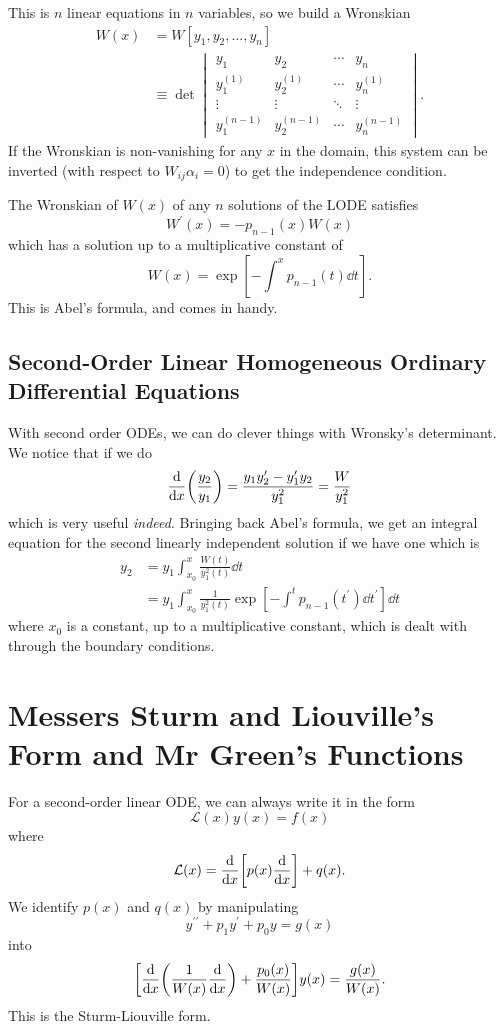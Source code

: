 \documentclass[a4paper,12pt,parskip=full,BCOR=1cm]{scrreprt}
\begin{document}
This is $n$ linear equations in $n$ variables, so we build a Wronskian
\begin{align*}
 W(x) & = W[y_1, y_2, \ldots, y_n] \\
      & \equiv \det
 \begin{vmatrix}
  y_1         & y_2         & \cdots & y_n         \\
  y_1^{(1)}   & y^{(1)}_2   & \cdots & y^{(1)}_n   \\
  \vdots      & \vdots      & \ddots & \vdots      \\
  y_1^{(n-1)} & y^{(n-1)}_2 & \cdots & y^{(n-1)}_n
 \end{vmatrix}.
\end{align*} If the Wronskian is non-vanishing for any $x$ in the domain, this system can be inverted (with respect to $W_{ij}\alpha_i = 0$) to get the independence condition.

The Wronskian of $W(x)$ of any $n$ solutions of the LODE satisfies
$$W^\prime (x) = -p_{n-1}(x)W(x)$$
which has a solution up to a multiplicative constant of
$$W(x) = \exp[-\int^x p_{n-1}(t) \dd{t}].$$ This is Abel's formula, and comes in handy.

\section{Second-Order Linear Homogeneous Ordinary Differential Equations}
With second order ODEs, we can do clever things with Wronsky's determinant.
We notice that if we do
$$\dv{x}(\frac{y_2}{y_1}) = \frac{y_1 y_2^\prime - y_1^\prime y_2}{y_1^2} = \frac{W}{y_1^2}$$ which is very useful \emph{indeed}.
Bringing back Abel's formula, we get an integral equation for the second linearly independent solution if we have one which is
\begin{align*}
 y_2 & = y_1 \int_{x_0}^x \frac{W(t)}{y_1^2(t)} \dd{t}                                            \\
     & =  y_1 \int_{x_0}^x \frac{1}{y_1^2(t)}\exp[-\int^t p_{n-1}(t^\prime) \dd{t^\prime}] \dd{t}
\end{align*}
where $x_0$ is a constant, up to a multiplicative constant, which is dealt with through the boundary conditions.

\chapter{Messers Sturm and Liouville's Form and Mr Green's Functions}
For a second-order linear ODE, we can always write it in the form
$$\mathcal{L}(x)y(x) = f(x)$$
where
$$\mathcal{L}(x) = \dv{x}\qty[p(x)\dv{x}] + q(x).$$
We identify $p(x)$ and $q(x)$ by manipulating
$$y^{\prime\prime} + p_1 y^\prime + p_0 y = g(x)$$
into
$$\qty[\dv{x}(\frac{1}{W(x)}\dv{x}) + \frac{p_0(x)}{W(x)}]y(x) = \frac{g(x)}{W(x)}.$$
This is the Sturm-Liouville form.
\end{document}
